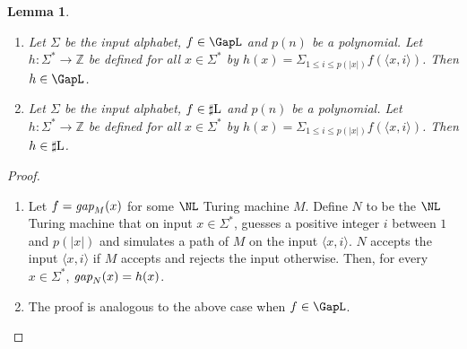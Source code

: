 \documentclass{amsbook}
\newtheorem{lemma}[theorem]{Lemma}
\theoremstyle{definition}
\theoremstyle{remark}
\numberwithin{section}{chapter}
\numberwithin{equation}{chapter}
\newcommand{\sharpL}{\mbox{$\sharp$\rm L}}
\newcommand{\Z}{\mathbb{Z}}
\newcommand{\gap}{\mbox{\it gap}}
\begin{document}
\begin{lemma}
\begin{enumerate}
\item Let $\Sigma$ be the input alphabet, $f\in\GapL$ and $p(n)$ be a polynomial. Let $h:\Sigma^*\rightarrow \Z$ be defined for all $x\in\Sigma^*$ by $h(x)=\Sigma_{1\leq i\leq p(|x|)}f(\langle x,i\rangle)$. Then $h\in\GapL$.
\item Let $\Sigma$ be the input alphabet, $f\in\sharpL$ and $p(n)$ be a polynomial. Let $h:\Sigma^*\rightarrow \Z$ be defined for all $x\in\Sigma^*$ by $h(x)=\Sigma_{1\leq i\leq p(|x|)}f(\langle x,i\rangle)$. Then $h\in\sharpL$.
\end{enumerate}
\end{lemma}
\begin{proof}
\begin{enumerate}
\item Let $f=\gap_M(x)$ for some $\NL$ Turing machine $M$. Define $N$ to be the $\NL$ Turing machine that on input $x\in\Sigma^*$, guesses a positive integer $i$ between $1$ and $p(|x|)$ and simulates a path of $M$ on the input $\langle x,i\rangle$. $N$ accepts the input $\langle x,i\rangle$ if $M$ accepts and rejects the input otherwise. Then, for every $x\in\Sigma^*$, $\gap_N(x)=h(x)$.
\item The proof is analogous to the above case when $f\in\GapL$.
\end{enumerate}
\end{proof}
\end{document}
